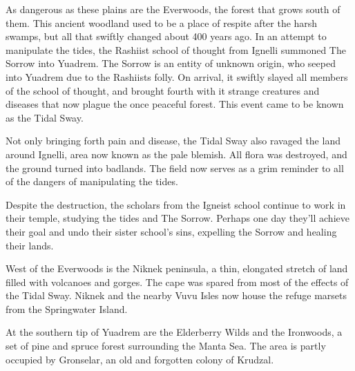 As dangerous as these plains are the Everwoods, the forest that grows south of them.
This ancient woodland used to be a place of respite after the harsh swamps, but all that swiftly changed about 400 years ago.
In an attempt to manipulate the tides, the Rashiist school of thought from Ignelli summoned The Sorrow into Yuadrem.
The Sorrow is an entity of unknown origin, who seeped into Yuadrem due to the Rashiists folly.
On arrival, it swiftly slayed all members of the school of thought, and brought fourth with it strange creatures and diseases that now plague the once peaceful forest.
This event came to be known as the Tidal Sway.

Not only bringing forth pain and disease, the Tidal Sway also ravaged the land around Ignelli, area now known as the pale blemish.
All flora was destroyed, and the ground turned into badlands.
The field now serves as a grim reminder to all of the dangers of manipulating the tides.

Despite the destruction, the scholars from the Igneist school continue to work in their temple, studying the tides and The Sorrow.
Perhaps one day they'll achieve their goal and undo their sister school's sins, expelling the Sorrow and healing their lands.

West of the Everwoods is the Niknek peninsula, a thin, elongated stretch of land filled with volcanoes and gorges.
The cape was spared from most of the effects of the Tidal Sway.
Niknek and the nearby Vuvu Isles now house the refuge marsets from the Springwater Island.

At the southern tip of Yuadrem are the Elderberry Wilds and the Ironwoods, a set of pine and spruce forest surrounding the Manta Sea.
The area is partly occupied by Gronselar, an old and forgotten colony of Krudzal.
